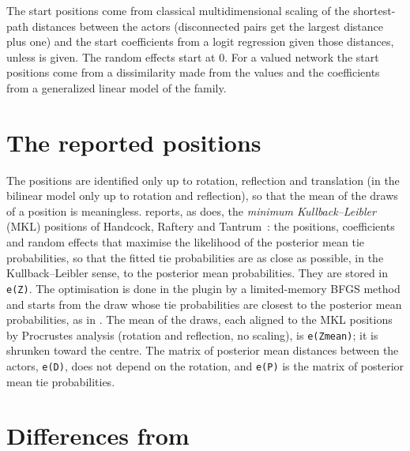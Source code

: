 The start positions come from classical multidimensional scaling of the shortest-path distances between the actors (disconnected pairs get the largest distance plus one) and the start coefficients from a logit regression given those distances, unless  is given. The random effects start at 0. For a valued network the start positions come from a dissimilarity made from the values and the coefficients from a generalized linear model of the family.

\section{The reported positions}\label{sec:mkl}

The positions are identified only up to rotation, reflection and translation (in the bilinear model only up to rotation and reflection), so that the mean of the draws of a position is meaningless. \nwlsm{} reports, as \latentnet{} does, the \emph{minimum Kullback--Leibler} (MKL) positions of Handcock, Raftery and Tantrum~\cite{handcock2007}: the positions, coefficients and random effects that maximise the likelihood of the posterior mean tie probabilities, so that the fitted tie probabilities are as close as possible, in the Kullback--Leibler sense, to the posterior mean probabilities. They are stored in \texttt{e(Z)}. The optimisation is done in the plugin by a limited-memory BFGS method and starts from the draw whose tie probabilities are closest to the posterior mean probabilities, as in \latentnet{}. The mean of the draws, each aligned to the MKL positions by Procrustes analysis (rotation and reflection, no scaling), is \texttt{e(Zmean)}; it is shrunken toward the centre. The matrix of posterior mean distances between the actors, \texttt{e(D)}, does not depend on the rotation, and \texttt{e(P)} is the matrix of posterior mean tie probabilities.

\section{Differences from \texorpdfstring{\latentnet}{latentnet}}\label{sec:deviations}

